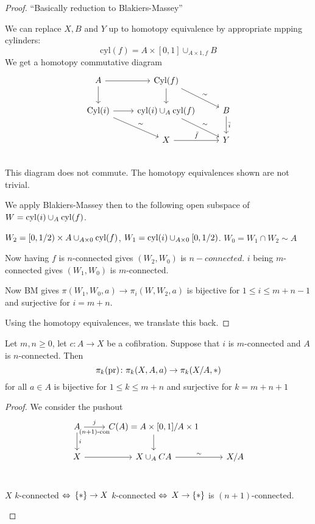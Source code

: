 \documentclass[language=english]{TemplateLecture}
\begin{document}
\begin{proof}
    \enquote{Basically reduction to Blakiers-Massey}

    We can replace \(X, B\) and \(Y\) up to homotopy equivalence by appropriate mpping cylinders:
    \[\mathrm{cyl}(f) = A\times [0,1]\cup_{A\times 1 , f} B\]
    We get a homotopy commutative diagram
    \[\begin{tikzcd}
        A \ar[r]\ar[d] & \mathrm{Cyl}(f) \ar[d]  \ar[rd, "\sim"]& \\
        \mathrm{Cyl}(i) \ar[r]\ar[rd, "\sim"] & \mathrm{cyl}(i) \cup_A \mathrm{cyl}(f)\ar[rd, "\sim"] & B\ar[d, "\bar i"] \\
        & X \ar[r, "\bar f"] & Y \\
    \end{tikzcd}\]
    This diagram does not commute. The homotopy equivalences shown are not trivial.

    We apply Blakiers-Massey then to the following open subspace of \(W = \mathrm{cyl}(i)\cup_A \mathrm{cyl}(f)\).

    \(W_2 = [0,1/2) \times A\cup_{A\times 0} \mathrm{cyl}(f)\), \(W_1 = \mathrm{cyl}(i) \cup_{A\times 0} [0, 1/2)\). \(W_0 = W_1\cap W_2 \sim A\)

    Now having \(f\) is \(n\)-connected gives \((W_2, W_0)\) is \(n-connected\). \(i\) being \(m\)-connected gives \((W_1, W_0)\) is \(m\)-connected.

    Now BM gives \(\pi(W_1, W_0, a)\to \pi_i(W, W_2, a)\) is bijective for \(1 \leq i \leq m+n-1\) and surjective for \(i = m+n\).

    Using the homotopy equivalences, we translate this back.
\end{proof}

\begin{proposition}[11.1 in Lücks]
    Let \(m,n \geq 0\), let \(c\colon A \to X \) be a cofibration. Suppose that \(i\) is \(m\)-connected and \(A\) is \(n\)-connected. Then 
    \[\pi_k(\operatorname{pr})\colon \pi_k(X,A,a) \to \pi_k(X/A, *)\]
    for all \(a \in A\) is bijective for \(1 \leq k \leq m+n\) and surjective for \(k = m+n+1\)
\end{proposition}

\begin{proof}
    We consider the pushout
    \[\begin{tikzcd}
        A \ar[d, "i"]\ar[r, "j", "(n+1)\text{-con}"'] & C(A) = A\times [0,1]/A\times 1 \ar[d] \\
        X \ar[r] & X \cup_A CA \ar[r, "\sim"] & X/A\\
    \end{tikzcd}\]

    \begin{remark}
        \(X\) \(k\)-connected \(\Leftrightarrow\) \(\{*\}\to X\) \(k\)-connected \(\Leftrightarrow\) \(X\to \{*\}\) is \((n+1)\)-connected.
    \end{remark}
\end{proof}
\end{document}
